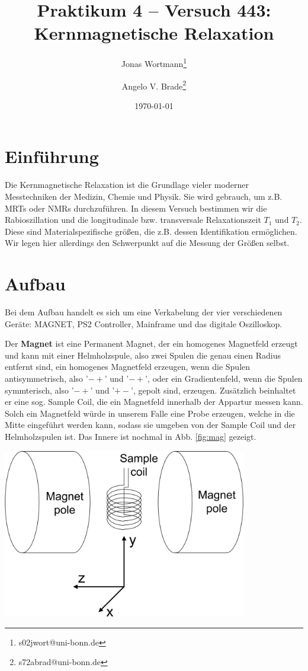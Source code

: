 \documentclass[10pt]{article}
\title{Praktikum 4 -- Versuch 443: Kernmagnetische Relaxation}
\author[1]{Jonas Wortmann\thanks{s02jwort@uni-bonn.de}}
\author[1]{Angelo V. Brade\thanks{s72abrad@uni-bonn.de}}
\affil[1]{Rheinische Friedrich-Wilhelms-Universität Bonn}
\date{\today}
\newenvironment{Figure}
  {\par\medskip\noindent\minipage{\linewidth}}
  {\endminipage\par\medskip}
\begin{document}
\maketitle



\pagestyle{fancy}
\fancyhead[R]{\thepage}
\fancyhead[L]{\leftmark}


\begin{multicols}{2}
  \section{Einführung}
  Die Kernmagnetische Relaxation ist die Grundlage vieler moderner Messtechniken der Medizin, Chemie und Physik. Sie wird gebrauch, um z.B. MRTs oder NMRs durchzuführen. In diesem Versuch bestimmen wir die Rabioszillation und die longitudinale bzw. transversale Relaxationszeit $T_1$ und $T_2$. Diese sind Materialspezifische größen, die z.B. dessen Identifikation ermöglichen. Wir legen hier allerdings den Schwerpunkt auf die Messung der Größen selbst.
  \section{Aufbau}
  Bei dem Aufbau handelt es sich um eine Verkabelung der vier verschiedenen Geräte: MAGNET, PS2 Controller, Mainframe und das digitale Oszilloskop.
  
  Der \textbf{Magnet} ist eine Permanent Magnet, der ein homogenes Magnetfeld erzeugt und kann mit einer Helmholzspule, also zwei Spulen die genau einen Radius entfernt sind, ein homogenes Magnetfeld erzeugen, wenn die Spulen antisymmetrisch, also '$-+$' und '$-+$', oder ein Gradientenfeld, wenn die Spulen symmterisch, also '$-+$' und '$+-$', gepolt sind, erzeugen. Zusätzlich beinhaltet er eine sog. Sample Coil, die ein Magnetfeld innerhalb der Appartur messen kann. Solch ein Magnetfeld würde in unserem Falle eine Probe erzeugen, welche in die Mitte eingeführt werden kann, sodass sie umgeben von der Sample Coil und der Helmholzspulen ist. Das Innere ist nochmal in Abb. \ref{fig:mag} gezeigt.
\begin{Figure}
  \centering\includegraphics[width=0.8\textwidth]{magnet_aufbau.png}
  \label{fig:mag}
\end{Figure}


\end{multicols}
\end{document}
